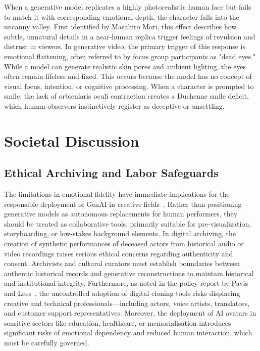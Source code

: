 \documentclass[pdflatex,sn-mathphys-num]{sn-jnl}
\theoremstyle{thmstyleone}
\theoremstyle{thmstyletwo}
\theoremstyle{thmstylethree}
\begin{document}
When a generative model replicates a highly photorealistic human face but fails to match it with corresponding emotional depth, the character falls into the uncanny valley. First identified by Masahiro Mori, this effect describes how subtle, unnatural details in a near-human replica trigger feelings of revulsion and distrust in viewers. In generative video, the primary trigger of this response is emotional flattening, often referred to by focus group participants as "dead eyes." While a model can generate realistic skin pores and ambient lighting, the eyes often remain lifeless and fixed. This occurs because the model has no concept of visual focus, intention, or cognitive processing. When a character is prompted to smile, the lack of orbicularis oculi contraction creates a Duchenne smile deficit, which human observers instinctively register as deceptive or unsettling.


\section{Societal Discussion}\label{sec5:societal}

\subsection{Ethical Archiving and Labor Safeguards}\label{subsec:ethical_labor}
The limitations in emotional fidelity have immediate implications for the responsible deployment of GenAI in creative fields~\cite{braid2024responsible}. Rather than positioning generative models as autonomous replacements for human performers, they should be treated as collaborative tools, primarily suitable for pre-visualization, storyboarding, or low-stakes background elements. In digital archiving, the creation of synthetic performances of deceased actors from historical audio or video recordings raises serious ethical concerns regarding authenticity and consent. Archivists and cultural curators must establish boundaries between authentic historical records and generative reconstructions to maintain historical and institutional integrity. Furthermore, as noted in the policy report by Pavis and Lees~\cite{pavis2025ai, signapselinkedin}, the uncontrolled adoption of digital cloning tools risks displacing creative and technical professionals—including actors, voice artists, translators, and customer support representatives. Moreover, the deployment of AI avatars in sensitive sectors like education, healthcare, or memorialisation introduces significant risks of emotional dependency and reduced human interaction, which must be carefully governed.
\end{document}
